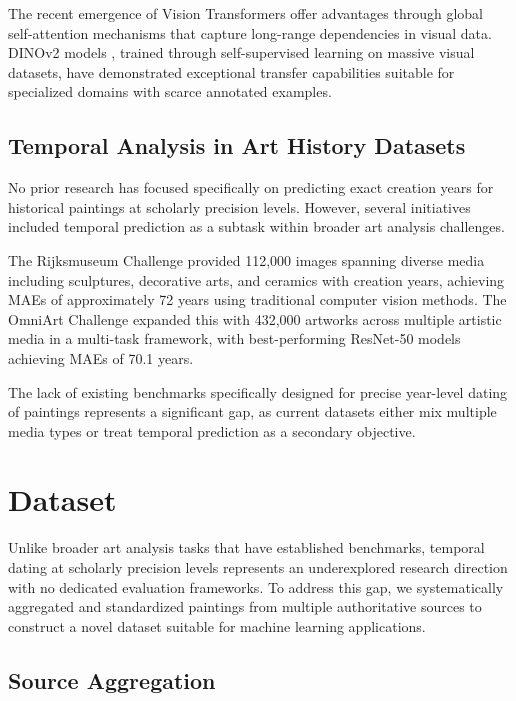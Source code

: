 \documentclass[10pt,twocolumn,letterpaper]{article}
\begin{document}
The recent emergence of Vision Transformers offer advantages through global self-attention mechanisms that capture long-range dependencies in visual data. DINOv2 models \cite{Oquab23}, trained through self-supervised learning on massive visual datasets, have demonstrated exceptional transfer capabilities suitable for specialized domains with scarce annotated examples.

\subsection{Temporal Analysis in Art History Datasets}

No prior research has focused specifically on predicting exact creation years for historical paintings at scholarly precision levels. However, several initiatives included temporal prediction as a subtask within broader art analysis challenges.

The Rijksmuseum Challenge \cite{Mensink14} provided 112,000 images spanning diverse media including sculptures, decorative arts, and ceramics with creation years, achieving MAEs of approximately 72 years using traditional computer vision methods. The OmniArt Challenge \cite{Strezoski18} expanded this with 432,000 artworks across multiple artistic media in a multi-task framework, with best-performing ResNet-50 models achieving MAEs of 70.1 years.

The lack of existing benchmarks specifically designed for precise year-level dating of paintings represents a significant gap, as current datasets either mix multiple media types or treat temporal prediction as a secondary objective.

\section{Dataset}

Unlike broader art analysis tasks that have established benchmarks, temporal dating at scholarly precision levels represents an underexplored research direction with no dedicated evaluation frameworks. To address this gap, we systematically aggregated and standardized paintings from multiple authoritative sources to construct a novel dataset suitable for machine learning applications.



\subsection{Source Aggregation}
\end{document}
